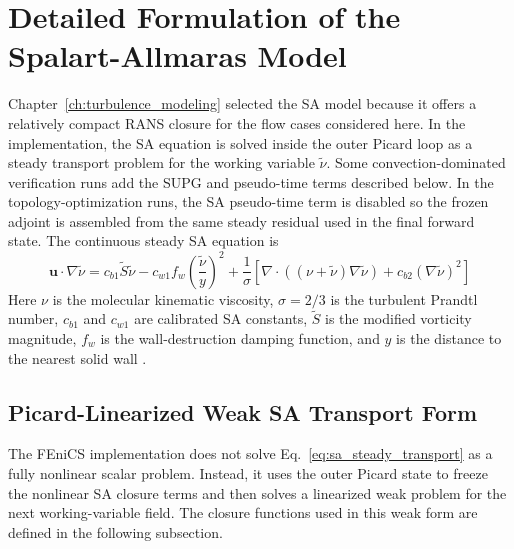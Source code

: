 \section{Detailed Formulation of the Spalart-Allmaras Model}
Chapter~\ref{ch:turbulence_modeling} selected the SA model because it offers a relatively compact RANS closure for the flow cases considered here. In the implementation, the SA equation is solved inside the outer Picard loop as a steady transport problem for the working variable $\tilde{\nu}$. Some convection-dominated verification runs add the SUPG and pseudo-time terms described below. In the topology-optimization runs, the SA pseudo-time term is disabled so the frozen adjoint is assembled from the same steady residual used in the final forward state. The continuous steady SA equation is
\begin{equation}
	\mathbf{u} \cdot \nabla \tilde{\nu} = c_{b1} \tilde{S} \tilde{\nu} - c_{w1} f_w \left( \frac{\tilde{\nu}}{y} \right)^2 + \frac{1}{\sigma} \left[ \nabla \cdot \left( (\nu + \tilde{\nu}) \nabla \tilde{\nu} \right) + c_{b2} (\nabla \tilde{\nu})^2 \right]
	\label{eq:sa_steady_transport}
\end{equation}
Here $\nu$ is the molecular kinematic viscosity, $\sigma=2/3$ is the turbulent Prandtl number, $c_{b1}$ and $c_{w1}$ are calibrated SA constants, $\tilde{S}$ is the modified vorticity magnitude, $f_w$ is the wall-destruction damping function, and $y$ is the distance to the nearest solid wall \cite{Spalart1994}.

\subsection{Picard-Linearized Weak SA Transport Form}
The FEniCS implementation does not solve Eq.~\ref{eq:sa_steady_transport} as a fully nonlinear scalar problem. Instead, it uses the outer Picard state to freeze the nonlinear SA closure terms and then solves a linearized weak problem for the next working-variable field. The closure functions used in this weak form are defined in the following subsection.

